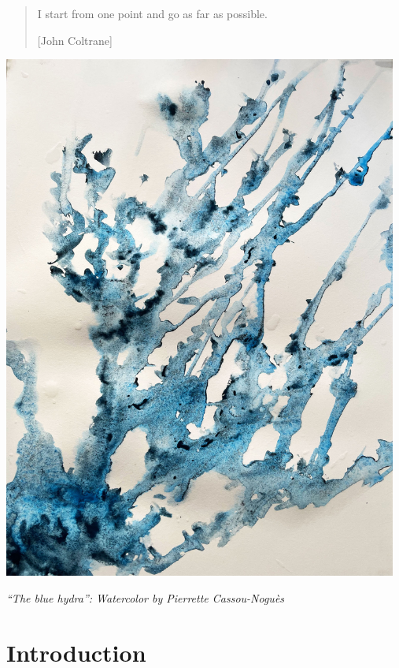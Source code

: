 \documentclass[twoside,a4paper]{book}
\begin{document}
\vspace{17mm}
\begin{quote} 
I start from one point and go as far as possible. 

[John Coltrane]
\end{quote}
\mbox{}
\newpage
\newpage
\thispagestyle{empty}
\label{watercolor}
 {\centering
      \includegraphics[width=13cm]{blue-hydra.jpg}
      \centerline{\emph{``The blue hydra'': Watercolor  by Pierrette Cassou-Noguès}}
}



  





 \tableofcontents



\chapter{Introduction}
\end{document}
